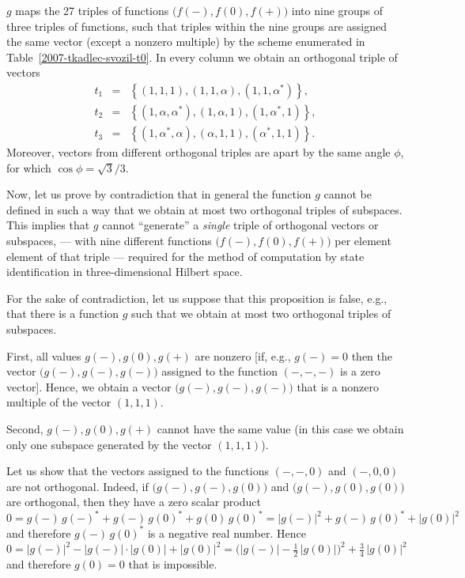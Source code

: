 \documentclass[fleqn,twoside]{article}
\begin{document}
$g$ maps the 27 triples of functions $\bigl( f(-), f(0), f(+) \bigr)$ into nine groups of three triples of functions,
such that triples within the nine groups are assigned the same vector (except a nonzero multiple)
by the scheme enumerated
in Table~\ref{2007-tkadlec-svozil-t0}.
In every column we obtain an orthogonal triple of vectors
$$
\begin {array}{rcl}
t_1&=&\left\{(1,1,1),(1,1,\alpha),(1,1,\alpha^\ast )\right\}, \\
t_2&=&\left\{(1,\alpha,\alpha^\ast ),(1,\alpha,1), (1,\alpha^\ast ,1)\right\},\\
t_3&=&\left\{(1,\alpha^\ast ,\alpha),(\alpha,1,1),(\alpha^\ast ,1,1) \right\}.
\end {array}
$$
Moreover,
vectors from different orthogonal triples are apart by the same angle $\phi$, for which
$\cos \phi = \sqrt3/3$.



Now, let us prove by contradiction that in general the function $g$ cannot be defined
in such a way that we obtain at most two orthogonal triples of subspaces.
This implies that $g$ cannot ``generate'' a {\em single} triple of orthogonal vectors or subspaces,
--- with nine different functions $\bigl( f(-), f(0), f(+) \bigr)$ per element element of that triple ---
required for the method of computation by state identification in three-dimensional Hilbert space.

For the sake of contradiction, let us suppose that this proposition is
false, e.g., that there is a function $g$ such that we obtain at most two
orthogonal triples of subspaces.


First, all values $g(-), g(0), g(+)$ are nonzero [if, e.g., $g(-) = 0$
then the vector $\bigl(g(-),g(-),g(-)\bigr)$ assigned to the function
$(-,-,-)$ is a zero vector]. Hence, we obtain a vector
$\bigl(g(-),g(-),g(-)\bigr)$ that is a nonzero multiple of the vector
$(1,1,1)$.


Second, $g(-), g(0), g(+)$ cannot have the same value (in this case we
obtain only one subspace generated by the vector $(1,1,1)$).


Let us show that the vectors assigned to the functions $(-,-,0)$ and
$(-,0,0)$ are not orthogonal. Indeed, if $\bigl(g(-),g(-),g(0)\bigr)$ and
$\bigl(g(-),g(0),g(0)\bigr)$ are orthogonal, then they have a zero scalar
product $0 = g(-) \,  {g(-)}^\ast + g(-) \,  {g(0)}^\ast + g(0) \,
{g(0)}^\ast = |g(-)|^2 + g(-) \,  {g(0)}^\ast + |g(0)|^2$ and
therefore $g(-) \, {g(0)}^\ast$ is a negative real number. Hence $0 =
|g(-)|^2 - |g(-)| \cdot |g(0)| + |g(0)|^2 = \bigl( |g(-)| - \frac 12 \,
|g(0)| \bigr)^2 + \frac 34 \, |g(0)|^2$ and therefore $g(0) = 0$ that is
impossible.
\end{document}
